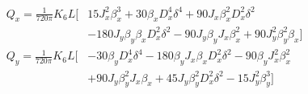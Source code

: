 \begin{equation}
  \begin{aligned}
  Q_x = \frac{1}{720\pi} K_6 L \biggl[
                                   &  15 J_x^2 \beta_x^3
                                     +30 \beta_x D_x^4 \delta^4 
                                     +90 J_x \beta_x^2 D_x^2 \delta^2 \\
                                   & -180 J_y \beta_y \beta_x D_x^2 \delta^2 
                                     -90 J_y \beta_y J_x \beta_x^2
                                     +90 J_y^2 \beta_y^2 \beta_x
                                                                                                        \biggr]\\
  Q_y = \frac{1}{720\pi} K_6 L \biggl[
                                   & -30 \beta_y D_x^4 \delta^4 
                                    -180 \beta_y J_x \beta_x D_x^2 \delta^2 
                                    -90  \beta_y J_x^2 \beta_x^2 \\
                                   & +90 J_y \beta_y^2 J_x \beta_x 
                                    +45 J_y \beta_y^2 D_x^2 \delta^2 
                                    -15 J_y^2 \beta_y ^3 
                                                                                                        \biggr]
  \end{aligned}
\end{equation}


